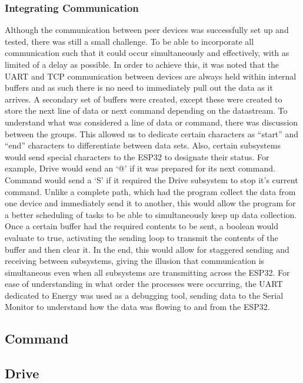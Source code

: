 \documentclass[a4paper]{article}
\begin{document}
\subsubsection{Integrating Communication}
 
Although the communication between peer devices was successfully set
up and tested, there was still a small challenge. To be able to
incorporate all communication such that it could occur simultaneously and
effectively, with as limited of a delay as possible. In order to achieve
this, it was noted that the UART and TCP communication between devices
are always held within internal buffers and as such there is no need to
immediately pull out the data as it arrives. A secondary set of buffers
were created, except these were created to store the next line of data or
next command depending on the datastream. To understand what was considered
a line of data or command, there was discussion between the groups. This
allowed us to dedicate certain characters as “start” and “end” characters
to differentiate between data sets. Also, certain subsystems would send
special characters to the ESP32 to designate their status. For example,
Drive would send an ‘@’ if it was prepared for its next command. Command
would send a ‘S’ if it required the Drive subsystem to stop it’s current
command. Unlike a complete path, which had the program collect the data
from one device and immediately send it to another, this would allow the
program for a better scheduling of tasks to be able to simultaneously keep
up data collection. Once a certain buffer had the required contents to be
sent, a boolean would evaluate to true, activating the sending loop to
transmit the contents of the buffer and then clear it. In the end, this
would allow for staggered sending and receiving between subsystems, giving
the illusion that communication is simultaneous even when all subsystems
are transmitting across the ESP32. For ease of understanding in what order
the processes were occurring, the UART dedicated to Energy was used as a
debugging tool, sending data to the Serial Monitor to understand how the
data was flowing to and from the ESP32.

\subsection{Command}

\subsection{Drive}
\end{document}
